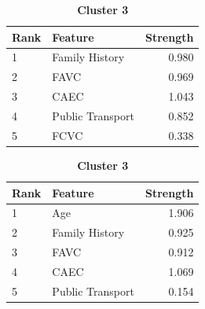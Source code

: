 \begin{table}[h]
\begin{minipage}[t]{0.48\textwidth}
\centering
\caption*{\textbf{Cluster 2}}
\renewcommand{\arraystretch}{1.2}
\begin{tabularx}{\textwidth}{lXr}
\hline
\textbf{Rank} & \textbf{Feature} & \textbf{Strength} \\
\hline
1 & Family History & 0.980 \\
2 & FAVC & 0.969 \\
3 & CAEC & 1.043 \\
4 & Public Transport & 0.852 \\
5 & FCVC & 0.338 \\
\hline
\end{tabularx}
\end{minipage}
\hfill
\begin{minipage}[t]{0.48\textwidth}
\centering
\caption*{\textbf{Cluster 3}}
\renewcommand{\arraystretch}{1.2}
\begin{tabularx}{\textwidth}{lXr}
\hline
\textbf{Rank} & \textbf{Feature} & \textbf{Strength} \\
\hline
1 & Age & 1.906 \\
2 & Family History & 0.925 \\
3 & FAVC & 0.912 \\
4 & CAEC & 1.069 \\
5 & Public Transport & 0.154 \\
\hline
\end{tabularx}
\end{minipage}
\end{table}


